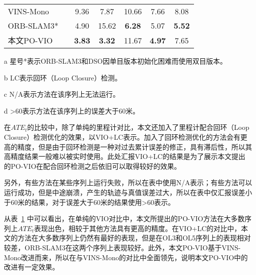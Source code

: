 \begin{table}
\begin{threeparttable}
{\begin{tabular}{lcccccc}
VINS-Mono       &                         & 9.36                                 & 7.87                                 & 10.66                                & 7.66                                 & 8.08                                 \\
ORB-SLAM3*       &                         & 4.90                                 & 15.62                                & \cellcolor[HTML]{FFCCC9}\textbf{6.28}                                 & 5.07                                 & \cellcolor[HTML]{FFCCC9}\textbf{5.52}                                 \\
本文PO-VIO            &                         & \cellcolor[HTML]{FFCCC9}\textbf{3.83}                                 & \cellcolor[HTML]{FFCCC9}\textbf{3.32}                                 & 11.67                                & \cellcolor[HTML]{FFCCC9}\textbf{4.97}                                 & 7.65                                 \\ \bottomrule
\end{tabular}}
\label{tab:vio_ate}
\begin{tablenotes}
  \item [a] 星号*表示ORB-SLAM3和DSO因单目版本初始化困难而使用双目版本。
  \item [b] LC表示回环（Loop Closure）检测。
  \item [c] N/A表示方法在该序列上无法运行。
  \item [d] \textgreater{}60表示方法在该序列上的误差大于60米。
\end{tablenotes}
\end{threeparttable}
\end{table}

在$ATE_t$的比较中，除了单纯的里程计对比，本文还加入了里程计配合回环（Loop Closure）检测优化的效果，以VIO+LC表示。加入了回环检测优化的方法会有更高的精度，但是由于回环检测是一种对过去累计误差的修正，具有滞后性，所以其高精度结果一般难以被实时使用。此处汇报VIO+LC的结果是为了展示本文提出的PO-VIO在配合回环检测之后依旧可以取得较好的效果。

另外，有些方法在某些序列上运行失败，所以在表中使用N/A表示；有些方法可以运行成功，但是中途崩溃，产生的轨迹与真值误差过大，所以在表中仅汇报误差小于60米的结果，对于误差大于60米的结果使用\textgreater{}60表示。

从表~\ref{tab:vio_ate} 中可以看出，在单纯的VIO对比中，本文所提出的PO-VIO方法在大多数序列上$ATE_t$表现出色，相较于其他方法具有更高的精度。在VIO+LC的对比中，本文的方法在大多数序列上仍然有最好的表现，但是在OL3和OL5序列上的表现相对较差，ORB-SLAM3在这两个序列上表现较好。此外，本文PO-VIO基于VINS-Mono改进而来，所以在与VINS-Mono的对比中全面领先，说明本文PO-VIO中的改进有一定效果。

